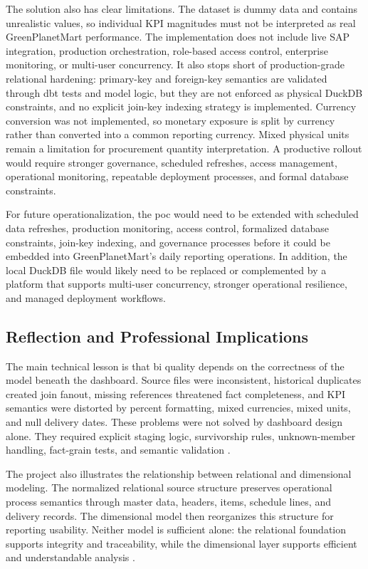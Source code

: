 The solution also has clear limitations. The dataset is dummy data and contains unrealistic values, so individual KPI magnitudes must not be interpreted as real GreenPlanetMart performance. The implementation does not include live SAP integration, production orchestration, role-based access control, enterprise monitoring, or multi-user concurrency. It also stops short of production-grade relational hardening: primary-key and foreign-key semantics are validated through \ac{dbt} tests and model logic, but they are not enforced as physical DuckDB constraints, and no explicit join-key indexing strategy is implemented. Currency conversion was not implemented, so monetary exposure is split by currency rather than converted into a common reporting currency. Mixed physical units remain a limitation for procurement quantity interpretation. A productive rollout would require stronger governance, scheduled refreshes, access management, operational monitoring, repeatable deployment processes, and formal database constraints.

For future operationalization, the \ac{poc} would need to be extended with scheduled data refreshes, production monitoring, access control, formalized database constraints, join-key indexing, and governance processes before it could be embedded into GreenPlanetMart's daily reporting operations. In addition, the local DuckDB file would likely need to be replaced or complemented by a platform that supports multi-user concurrency, stronger operational resilience, and managed deployment workflows.

\subsection{Reflection and Professional Implications}

The main technical lesson is that \ac{bi} quality depends on the correctness of the model beneath the dashboard. Source files were inconsistent, historical duplicates created join fanout, missing references threatened fact completeness, and KPI semantics were distorted by percent formatting, mixed currencies, mixed units, and null delivery dates. These problems were not solved by dashboard design alone. They required explicit staging logic, survivorship rules, unknown-member handling, fact-grain tests, and semantic validation \parencite{wang_beyond_1996,yair_wand_anchoring_1996}.

The project also illustrates the relationship between relational and dimensional modeling. The normalized relational source structure preserves operational process semantics through master data, headers, items, schedule lines, and delivery records. The dimensional model then reorganizes this structure for reporting usability. Neither model is sufficient alone: the relational foundation supports integrity and traceability, while the dimensional layer supports efficient and understandable analysis \parencite{codd_relational_1970,moody_enterprise_2000}.

